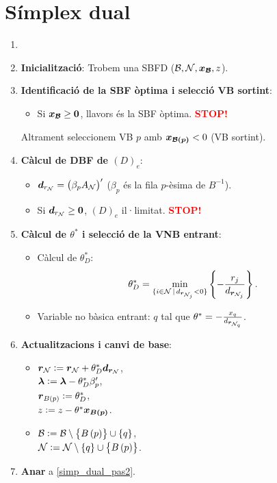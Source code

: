 \section{Símplex dual}
\begin{alg}
    \begin{enumerate}
        \item[]
        \item {\bf Inicialització}: Trobem una SBFD ($\mathcal{B}, \mathcal{N}, \boldsymbol{x_{\mathcal{B}}}, z$).
        \item \label{simp_dual_pas2} {\bf Identificació de la SBF òptima i selecció VB sortint}:
            \begin{itemize}
                \item Si $\boldsymbol{x_{\mathcal{B}}} \geq \boldsymbol{0}$, llavors és la SBF òptima. \textcolor{red}{\bf STOP!}
            \end{itemize}
            Altrament seleccionem VB $p$ amb $\boldsymbol{x_{\mathcal{B}\left(p\right)}} < 0$ (VB sortint).
        \item {\bf Càlcul de DBF de $\left(D\right)_e$}:
            \begin{itemize}
                \item $\boldsymbol{d}_{r_{\mathcal{N}}} = \left(\beta_p A_{\mathcal{N}}\right)^\prime$ ($\beta_p$ és la fila $p$-èsima de $B^{-1}$).
                \item Si $\boldsymbol{d}_{r_{\mathcal{N}}} \geq \boldsymbol{0}$, $\left(D\right)_e$ il·limitat. \textcolor{red}{\bf STOP!}
            \end{itemize}
        \item {\bf Càlcul de $\theta^*$ i selecció de la VNB entrant}:
            \begin{itemize}
                \item Càlcul de $\theta_D^*$: 
                    \[\theta_D^* = \min_{\{i \in \mathcal{N} \,|\, d_{\boldsymbol{r}_{\mathcal{N}_j}} < 0\}} \left\{-\frac{r_j}{d_{\boldsymbol{r}_{\mathcal{N}_j}}} \right\}.\]
                \item Variable no bàsica entrant: $q$ tal que $\theta^* = -\frac{x_q}{d_{\boldsymbol{r}_{\mathcal{N}_q}}}$.
            \end{itemize}
        \item {\bf Actualitzacions i canvi de base}:
            \begin{itemize}
                \item $\boldsymbol{r}_{\mathcal{N}} := \boldsymbol{r}_{\mathcal{N}} + \theta_D^* \boldsymbol{d}_{\boldsymbol{r}_{\mathcal{N}}}$, \\
                    $\boldsymbol{\lambda} := \boldsymbol{\lambda} - \theta_D^* \beta_p^\prime$, \\
                    $\boldsymbol{r}_{B\left(p\right)} := \theta_D^*$, \\
                    $z := z - \theta^* \boldsymbol{x_{B\left(p\right)}}$.
                \item $\mathcal{B} := \mathcal{B} \setminus \left\{B\left(p\right)\right\} \cup \left\{q\right\}$, \\
                    $\mathcal{N} := \mathcal{N} \setminus \left\{q\right\} \cup \left\{B\left(p\right)\right\}$.
            \end{itemize}
        \item {\bf Anar} a \ref{simp_dual_pas2}.
    \end{enumerate}
\end{alg}

